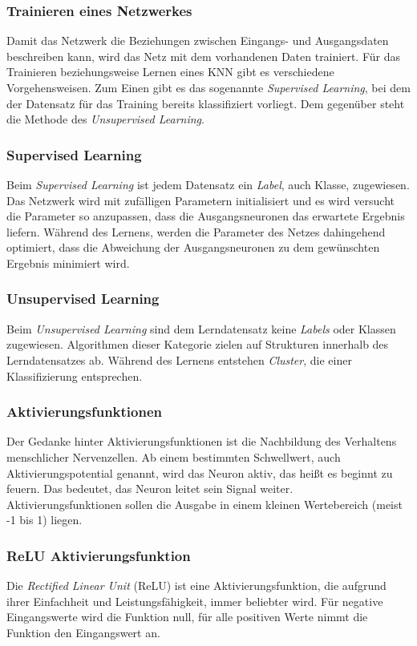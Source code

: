 \documentclass[11pt]{article}
\begin{document}
\subsubsection{Trainieren eines Netzwerkes}

Damit das Netzwerk die Beziehungen zwischen Eingangs- und Ausgangsdaten beschreiben kann, wird das Netz mit dem vorhandenen Daten trainiert. Für das Trainieren beziehungsweise Lernen eines KNN gibt es verschiedene Vorgehensweisen. Zum Einen gibt es das sogenannte \textit{Supervised Learning}, bei dem der Datensatz für das Training bereits klassifiziert vorliegt. Dem gegenüber steht die Methode des \textit{Unsupervised Learning}.

\subsubsection*{Supervised Learning}
Beim \textit{Supervised Learning} ist jedem Datensatz ein \textit{Label}, auch Klasse, zugewiesen. Das Netzwerk wird mit zufälligen Parametern initialisiert und es wird versucht die Parameter so anzupassen, dass die Ausgangsneuronen das erwartete Ergebnis liefern. Während des Lernens, werden die Parameter des Netzes dahingehend optimiert, dass die Abweichung der Ausgangsneuronen zu dem gewünschten Ergebnis minimiert wird.\parencite{Pattanayak2017}

\subsubsection*{Unsupervised Learning}
Beim \textit{Unsupervised Learning} sind dem Lerndatensatz keine \textit{Labels} oder Klassen zugewiesen. Algorithmen dieser Kategorie zielen auf Strukturen innerhalb des Lerndatensatzes ab. Während des Lernens entstehen \textit{Cluster}, die einer Klassifizierung entsprechen.\parencite{Pattanayak2017}

\subsubsection{Aktivierungsfunktionen}
Der Gedanke hinter Aktivierungsfunktionen ist die Nachbildung des Verhaltens menschlicher Nervenzellen. Ab einem bestimmten Schwellwert, auch Aktivierungspotential  genannt, wird das Neuron aktiv, das heißt es beginnt zu feuern. Das bedeutet, das Neuron leitet sein Signal weiter. Aktivierungsfunktionen sollen die Ausgabe in einem kleinen Wertebereich (meist -1 bis 1) liegen.\parencite{Manaswi2018}

\subsubsection*{ReLU Aktivierungsfunktion}
Die \textit{Rectified Linear Unit} (ReLU) ist eine Aktivierungsfunktion, die aufgrund ihrer Einfachheit und Leistungsfähigkeit, immer beliebter wird. Für negative Eingangswerte wird die Funktion null, für alle positiven Werte nimmt die Funktion den Eingangswert an.\parencite{M.AnderssonM.Arvola}
\end{document}
